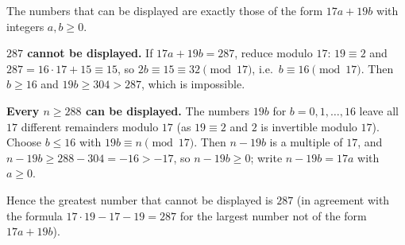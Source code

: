 The numbers that can be displayed are exactly those of the form $17a+19b$ with integers $a,b\ge0$.

\textbf{$287$ cannot be displayed.} If $17a+19b=287$, reduce modulo $17$: $19\equiv2$ and $287=16\cdot17+15\equiv15$, so $2b\equiv15\equiv32\pmod{17}$, i.e.\ $b\equiv16\pmod{17}$. Then $b\ge16$ and $19b\ge304>287$, which is impossible.

\textbf{Every $n\ge288$ can be displayed.} The numbers $19b$ for $b=0,1,\dots,16$ leave all $17$ different remainders modulo $17$ (as $19\equiv2$ and $2$ is invertible modulo $17$). Choose $b\le16$ with $19b\equiv n\pmod{17}$. Then $n-19b$ is a multiple of $17$, and $n-19b\ge288-304=-16>-17$, so $n-19b\ge0$; write $n-19b=17a$ with $a\ge0$.

Hence the greatest number that cannot be displayed is $\boxed{287}$ (in agreement with the formula $17\cdot19-17-19=287$ for the largest number not of the form $17a+19b$).
